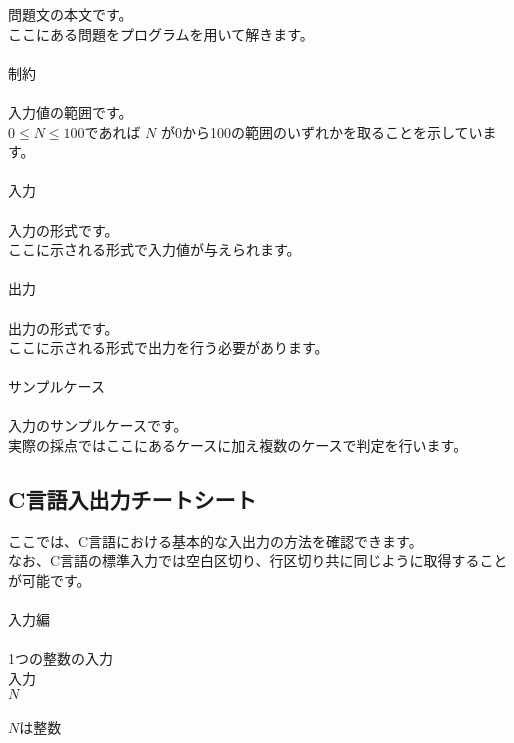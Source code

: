 \noindent
問題文の本文です。\\
ここにある問題をプログラムを用いて解きます。 
\\ \\ \noindent
{\LARGE 制約}\\ \hrulefill \\

\noindent
入力値の範囲です。\\
$0 \leq N \leq 100$であれば $N$ が0から100の範囲のいずれかを取ることを示しています。 
\\ \\
\noindent
{\LARGE 入力}\\ \hrulefill \\

\noindent
入力の形式です。\\
ここに示される形式で入力値が与えられます。 
\\ \\
\noindent
{\LARGE 出力}\\ \hrulefill \\

\noindent
出力の形式です。\\
ここに示される形式で出力を行う必要があります。 
\\ \\
\noindent
{\LARGE サンプルケース}\\ \hrulefill \\

\noindent
入力のサンプルケースです。\\
実際の採点ではここにあるケースに加え複数のケースで判定を行います。 

\clearpage

\subsection{C言語入出力チートシート}

\noindent
ここでは、C言語における基本的な入出力の方法を確認できます。\\
なお、C言語の標準入力では空白区切り、行区切り共に同じように取得することが可能です。
\\ \\ \noindent
{\LARGE 入力編}\\ \hrulefill \\
{\Large 1つの整数の入力}\\ 
入力\\
$N$
\\ \\ \noindent
$N$は整数

